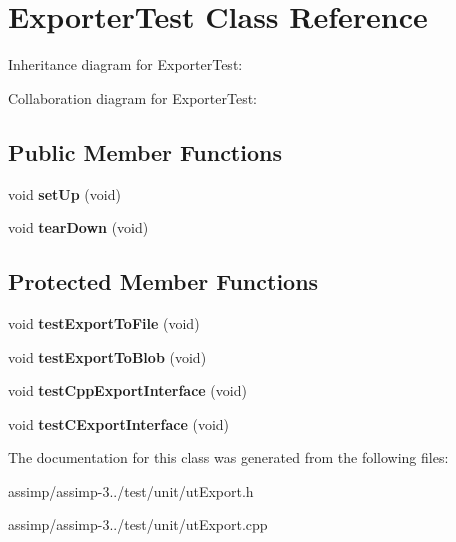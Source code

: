 \hypertarget{class_exporter_test}{\section{Exporter\+Test Class Reference}
\label{class_exporter_test}
}


Inheritance diagram for Exporter\+Test\+:


Collaboration diagram for Exporter\+Test\+:
\subsection*{Public Member Functions}
\begin{DoxyCompactItemize}
\item 
\hypertarget{class_exporter_test_a685b2423a3b806846598dd530903d261}{void {\bfseries set\+Up} (void)}\label{class_exporter_test_a685b2423a3b806846598dd530903d261}

\item 
\hypertarget{class_exporter_test_a988a9cd27c5ab246ab4b74b5b394f025}{void {\bfseries tear\+Down} (void)}\label{class_exporter_test_a988a9cd27c5ab246ab4b74b5b394f025}

\end{DoxyCompactItemize}
\subsection*{Protected Member Functions}
\begin{DoxyCompactItemize}
\item 
\hypertarget{class_exporter_test_a1a614b3dc032ad6a71810aaf1fd03d3a}{void {\bfseries test\+Export\+To\+File} (void)}\label{class_exporter_test_a1a614b3dc032ad6a71810aaf1fd03d3a}

\item 
\hypertarget{class_exporter_test_aee7079c5bed56d88dac1d4de6676d28a}{void {\bfseries test\+Export\+To\+Blob} (void)}\label{class_exporter_test_aee7079c5bed56d88dac1d4de6676d28a}

\item 
\hypertarget{class_exporter_test_ab859bb9afef9deaa00600fb44b714f85}{void {\bfseries test\+Cpp\+Export\+Interface} (void)}\label{class_exporter_test_ab859bb9afef9deaa00600fb44b714f85}

\item 
\hypertarget{class_exporter_test_a6600fa935ed14c78fb127fc7d40d260a}{void {\bfseries test\+C\+Export\+Interface} (void)}\label{class_exporter_test_a6600fa935ed14c78fb127fc7d40d260a}

\end{DoxyCompactItemize}


The documentation for this class was generated from the following files\+:\begin{DoxyCompactItemize}
\item 
assimp/assimp-\/3../test/unit/ut\+Export.\+h\item 
assimp/assimp-\/3../test/unit/ut\+Export.\+cpp\end{DoxyCompactItemize}
